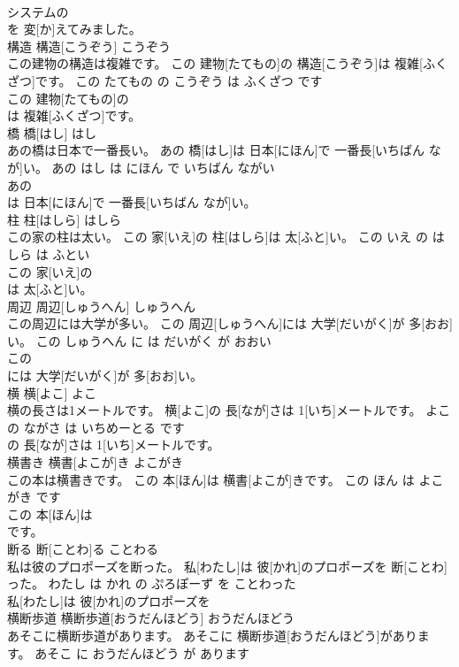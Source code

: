 \documentclass[8pt]{extreport}
\begin{document}
\begin{CJK}{UTF8}{min}
\\	システムの
\\	を 変[か]えてみました。			
\\	構造	構造[こうぞう]	こうぞう	
\\	この建物の構造は複雑です。	この 建物[たてもの]の 構造[こうぞう]は 複雑[ふくざつ]です。	この たてもの の こうぞう は ふくざつ です	
\\	この 建物[たてもの]の
\\	は 複雑[ふくざつ]です。			
\\	橋	橋[はし]	はし	
\\	あの橋は日本で一番長い。	あの 橋[はし]は 日本[にほん]で 一番長[いちばん なが]い。	あの はし は にほん で いちばん ながい	
\\	あの
\\	は 日本[にほん]で 一番長[いちばん なが]い。			
\\	柱	柱[はしら]	はしら	
\\	この家の柱は太い。	この 家[いえ]の 柱[はしら]は 太[ふと]い。	この いえ の はしら は ふとい	
\\	この 家[いえ]の
\\	は 太[ふと]い。			
\\	周辺	周辺[しゅうへん]	しゅうへん	
\\	この周辺には大学が多い。	この 周辺[しゅうへん]には 大学[だいがく]が 多[おお]い。	この しゅうへん に は だいがく が おおい	
\\	この
\\	には 大学[だいがく]が 多[おお]い。			
\\	横	横[よこ]	よこ	
\\	横の長さは1メートルです。	横[よこ]の 長[なが]さは 1[いち]メートルです。	よこ の ながさ は いちめーとる です	
\\	の 長[なが]さは 1[いち]メートルです。			
\\	横書き	横書[よこが]き	よこがき	
\\	この本は横書きです。	この 本[ほん]は 横書[よこが]きです。	この ほん は よこがき です	
\\	この 本[ほん]は
\\	です。			
\\	断る	断[ことわ]る	ことわる	
\\	私は彼のプロポーズを断った。	私[わたし]は 彼[かれ]のプロポーズを 断[ことわ]った。	わたし は かれ の ぷろぽーず を ことわった	
\\	私[わたし]は 彼[かれ]のプロポーズを
\\	横断歩道	横断歩道[おうだんほどう]	おうだんほどう	
\\	あそこに横断歩道があります。	あそこに 横断歩道[おうだんほどう]があります。	あそこ に おうだんほどう が あります	

\end{CJK}
\end{document}
